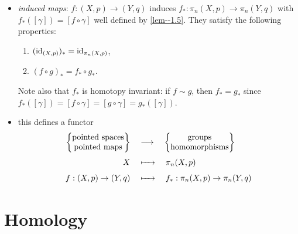 \documentclass[a4paper,11pt]{article}
\begin{document}
\begin{pro}
\begin{itemize}
					\item \textit{induced maps}: $f:(X,p)\rightarrow (Y,q)$ induces $f_{\ast}:\pi_{n}(X,p)\rightarrow \pi_{n}(Y,q)$ with $f_{\ast}([\gamma])=[f \circ \gamma]$ well defined by \autoref{lem--1.5}. They satisfy the following properties:
					\begin{enumerate}
						\item $(\operatorname{id}_{(X,p)})_{\ast}=\operatorname{id}_{\pi_{n}(X,p)}$,
						\item $(f \circ g)_{\ast}=f_{\ast} \circ g_{\ast}$.
					\end{enumerate}
					Note also that $f_{\ast}$ is homotopy invariant: if $f\sim g$, then $f_\ast=g_\ast$ since $f_\ast([\gamma])=[f \circ \gamma]=[g\circ \gamma]=g_{\ast}([\gamma])$.
					\item this defines a functor
						\begin{align*}
						\begin{Bmatrix}
							\text{pointed spaces}\\\text{pointed maps}
						\end{Bmatrix}
						\quad&\longrightarrow\quad 
						\begin{Bmatrix}
							\text{groups}\\ \text{homomorphisms}
						\end{Bmatrix}\\
						X\quad&\xmapsto{\phantom{kkl}}\quad \pi_{n}(X,p)\\
						f:(X,p)\rightarrow (Y,q)\quad&\xmapsto{\phantom{kkl}} \quad f_{\ast}:\pi_{n}(X,p)\rightarrow \pi_{n}(Y,q) 
						\end{align*}
				\end{itemize}
			\end{pro}


	\section{Homology}
\end{document}
